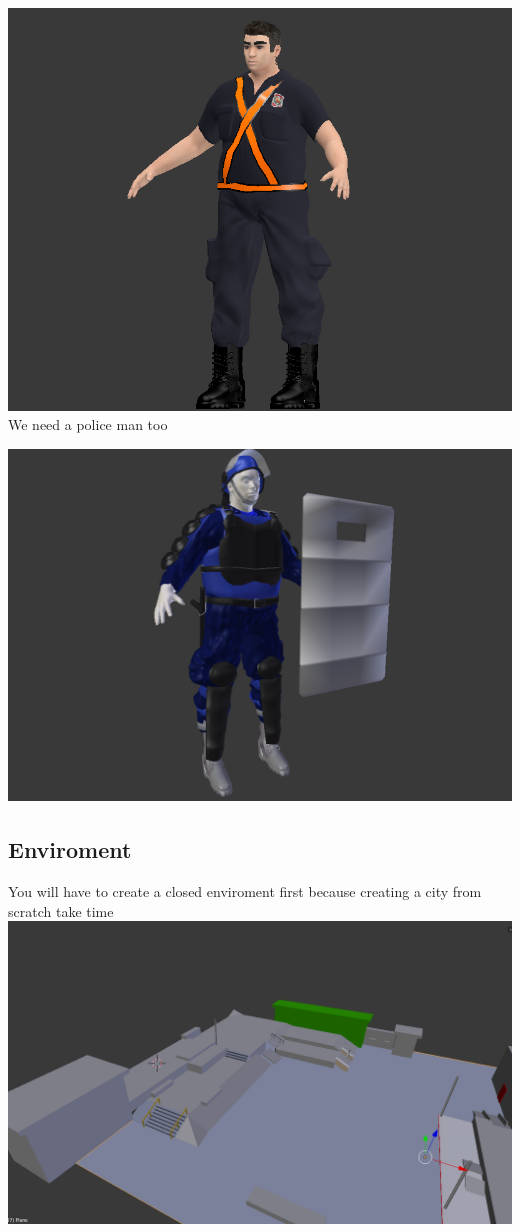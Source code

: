 \documentclass{article}
\begin{document}
  \includegraphics[width=\textwidth]{36.png}
  We need a police man too
  
  \includegraphics[width=\textwidth]{45.png}

  \subsection{Enviroment}
  You will have to create a closed enviroment first because creating a city from scratch take time 
  \includegraphics[width=\textwidth]{25.png}
  
\end{document}
